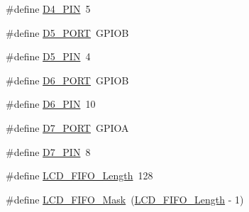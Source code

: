 \begin{DoxyCompactItemize}
\item 
\#define \mbox{\hyperlink{group___l_c_d_h_d44780_non_blocking_ga397c2c535f67a13298ac59cd4a5aba4c_ga397c2c535f67a13298ac59cd4a5aba4c}{D4\+\_\+\+P\+IN}}~5
\item 
\#define \mbox{\hyperlink{group___l_c_d_h_d44780_non_blocking_gaf46533a3dd7bc93c1371f1fa7daab07f_gaf46533a3dd7bc93c1371f1fa7daab07f}{D5\+\_\+\+P\+O\+RT}}~G\+P\+I\+OB
\item 
\#define \mbox{\hyperlink{group___l_c_d_h_d44780_non_blocking_ga9c3b90946c5e3746cf8b032e34c7d824_ga9c3b90946c5e3746cf8b032e34c7d824}{D5\+\_\+\+P\+IN}}~4
\item 
\#define \mbox{\hyperlink{group___l_c_d_h_d44780_non_blocking_gaf55da3fa3f8bbdb1e0237ba04a8570c9_gaf55da3fa3f8bbdb1e0237ba04a8570c9}{D6\+\_\+\+P\+O\+RT}}~G\+P\+I\+OB
\item 
\#define \mbox{\hyperlink{group___l_c_d_h_d44780_non_blocking_ga5b6dc21cf46572ec4c1349b26bed67e9_ga5b6dc21cf46572ec4c1349b26bed67e9}{D6\+\_\+\+P\+IN}}~10
\item 
\#define \mbox{\hyperlink{group___l_c_d_h_d44780_non_blocking_ga57ce904a230082472c561269513a9bf6_ga57ce904a230082472c561269513a9bf6}{D7\+\_\+\+P\+O\+RT}}~G\+P\+I\+OA
\item 
\#define \mbox{\hyperlink{group___l_c_d_h_d44780_non_blocking_gabb43489f7452bd6cd0e820071f22c74d_gabb43489f7452bd6cd0e820071f22c74d}{D7\+\_\+\+P\+IN}}~8
\item 
\#define \mbox{\hyperlink{group___l_c_d_h_d44780_non_blocking_gabadb170a13a0a14adb963ef388742618_gabadb170a13a0a14adb963ef388742618}{L\+C\+D\+\_\+\+F\+I\+F\+O\+\_\+\+Length}}~128
\item 
\#define \mbox{\hyperlink{group___l_c_d_h_d44780_non_blocking_ga081577943699e079400d56118ad0c170_ga081577943699e079400d56118ad0c170}{L\+C\+D\+\_\+\+F\+I\+F\+O\+\_\+\+Mask}}~(\mbox{\hyperlink{group___l_c_d_h_d44780_non_blocking_gabadb170a13a0a14adb963ef388742618_gabadb170a13a0a14adb963ef388742618}{L\+C\+D\+\_\+\+F\+I\+F\+O\+\_\+\+Length}} -\/ 1)
\end{DoxyCompactItemize}
